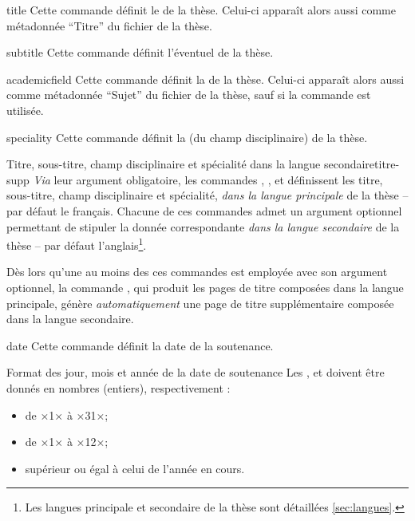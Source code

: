 \begin{docCommand}[doc description=\mandatory]{title}{}
  Cette commande définit le  de la thèse. Celui-ci apparaît alors
  aussi comme métadonnée \enquote{Titre} du fichier \pdf de la thèse.
\end{docCommand}
%
\begin{docCommand}{subtitle}{}
  Cette commande définit l'éventuel  de la thèse.
\end{docCommand}
%
\begin{docCommand}[doc description=\mandatory]{academicfield}{}
  Cette commande définit la  
  de la thèse. Celui-ci apparaît alors aussi comme métadonnée \enquote{Sujet} du
  fichier \pdf de la thèse, sauf si la commande  est utilisée.
\end{docCommand}
%
\begin{docCommand}{speciality}{}
  Cette commande définit la  (du champ
  disciplinaire) de la thèse.
\end{docCommand}
%
\begin{dbremark}{Titre, sous-titre, champ disciplinaire et spécialité dans la
    langue secondaire}{titre-supp}
  \emph{Via} leur argument obligatoire, les commandes ,
  ,  et  définissent
  les titre, sous-titre, champ disciplinaire et spécialité, \emph{dans la
    langue principale} de la thèse -- par défaut le français. Chacune de ces
  commandes admet un argument optionnel permettant de stipuler la donnée
  correspondante \emph{dans la langue secondaire} de la thèse -- par défaut
  l'anglais\footnote{Les langues principale et secondaire de la thèse sont
    détaillées \vref{sec:langues}.}.

  Dès lors qu'une au moins des ces commandes est employée avec son argument
  optionnel, la commande , qui produit les pages de titre
  composées dans la langue principale, génère \emph{automatiquement} une page
  de titre supplémentaire composée dans la langue secondaire.
\end{dbremark}
%
\begin{docCommand}[doc description=\mandatory]{date}{}
  Cette commande définit la date de la soutenance.
  \begin{dbwarning}{Format des jour, mois et année de la date de
      soutenance}{}
    Les ,  et  doivent être donnés
    en nombres (entiers), respectivement :
    \begin{itemize}
    \item de ×1× à ×31×;
    \item de ×1× à ×12×;
    \item supérieur ou égal à celui de l'année en cours.
    \end{itemize}
  \end{dbwarning}
\end{docCommand}
